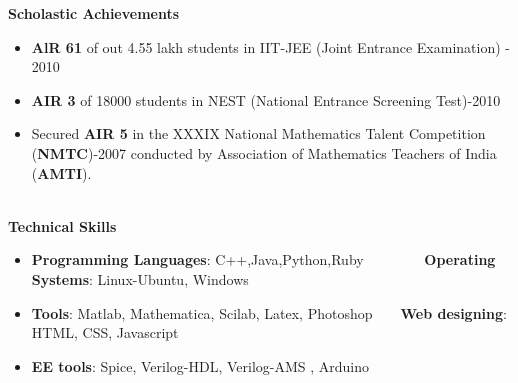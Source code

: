 \documentclass[a4paper,10pt]{article}
\newcommand{\resheading}[1]{{\small \colorbox{mygrey}{\begin{minipage}{0.975\textwidth}{\textbf{#1 \vphantom{p\^{E}}}}\end{minipage}}}}
\begin{document}
\resheading{\textbf{\large Scholastic Achievements}}
\begin{itemize}
  \item \textbf{AlR 61} of out 4.55 lakh students in IIT-JEE (Joint Entrance Examination) - 2010 \\[-0.7cm]
  
\item \textbf{AIR 3} of 18000 students in NEST (National Entrance Screening Test)-2010  \\[-0.7cm]%

  
 \item Secured \textbf{AIR 5} in the  XXXIX National Mathematics Talent Competition (\textbf{NMTC})-2007 conducted by Association of Mathematics Teachers of India (\textbf{AMTI}).\\[-0.7cm]
  \\
\end{itemize}

\resheading{\textbf{\large Technical Skills}}
\begin{itemize}
  \item \textbf{Programming Languages}: C++,Java,Python,Ruby \  \ \ \ \ \ \ \  \textbf{Operating Systems}: Linux-Ubuntu, Windows\\[-0.6cm]
  \item \textbf{Tools}: Matlab, Mathematica, Scilab, Latex, Photoshop\ \ \ \  \textbf{Web designing}: HTML, CSS, Javascript\\[-0.6cm]
  \item \textbf{EE tools}: Spice, Verilog-HDL, Verilog-AMS , Arduino
\end{itemize}
\end{document}
